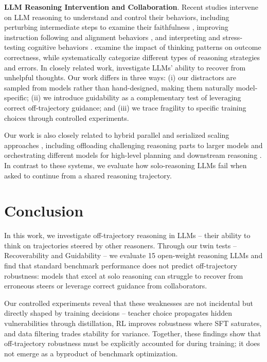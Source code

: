 \documentclass{article} %
\begin{document}
\textbf{LLM Reasoning Intervention and Collaboration}. Recent studies intervene on LLM reasoning to understand and control their behaviors, including perturbing intermediate steps to examine their faithfulness \citep{arcuschin2025chain, baker2025monitoring}, improving instruction following and alignment behaviors \citep{wu2025effectively, muennighoff2025s1}, and interpreting \citep{lee2025cot, marjanovic2025deepseek} and stress-testing cognitive behaviors \citep{gandhi2025cognitive}. \cite{wen2025thinkpatterns} examine the impact of thinking patterns on outcome correctness, while \cite{he2025can, lee2025cot} systematically categorize different types of reasoning strategies and errors. In closely related work, \cite{he2025can} investigate LLMs' ability to recover from unhelpful thoughts. Our work differs in three ways: (i) our distractors are sampled from models rather than hand-designed, making them naturally model-specific; (ii) we introduce guidability as a complementary test of leveraging correct off-trajectory guidance; and (iii) we trace fragility to specific training choices through controlled experiments.

Our work is also closely related to hybrid parallel and serialized scaling approaches \citep{pan2025learning}, including offloading challenging reasoning parts to larger models \cite{akhauri2025splitreason, yang2025speculative} and orchestrating different models for high-level planning and downstream reasoning \cite{lee2025collaborative, wan2025rema}. In contrast to these systems, we evaluate how solo-reasoning LLMs fail when asked to continue from a shared reasoning trajectory.

\section{Conclusion}
In this work, we investigate off-trajectory reasoning in LLMs -- their ability to think on trajectories steered by other reasoners. Through our twin tests -- Recoverability and Guidability -- we evaluate 15 open-weight reasoning LLMs and find that standard benchmark performance does not predict off-trajectory robustness: models that excel at solo reasoning can struggle to recover from erroneous steers or leverage correct guidance from collaborators.

Our controlled experiments reveal that these weaknesses are not incidental but directly shaped by training decisions -- teacher choice propagates hidden vulnerabilities through distillation, RL improves robustness where SFT saturates, and data filtering trades stability for variance. Together, these findings show that off-trajectory robustness must be explicitly accounted for during training; it does not emerge as a byproduct of benchmark optimization.
\end{document}
